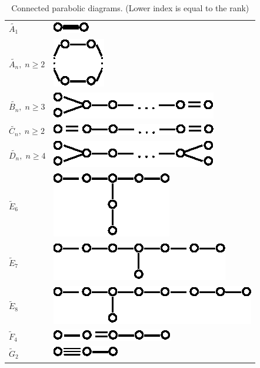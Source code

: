 \begin{center}
\renewcommand{\arraystretch}{1.1}
\tabcolsep=10pt
\begin{longtable}{@{}l@{\qquad\quad}l@{}}
\caption{Connected parabolic diagrams. (Lower index is equal to the rank)}\label{art10-table-2}\\
$\tilde{A_1}$ & {\includegraphics{345a1.eps}}\\
$\tilde{A_n}, \; n \geqslant 2$ & {\includegraphics{345a2.eps}}\\
$\tilde{B_n}, \; n \geqslant 3$ & {\includegraphics{345a3.eps}}\\
$\tilde{C_n}, \; n \geqslant 2$ & {\includegraphics{345a4.eps}}\\
$\tilde{D_n}, \; n \geqslant 4$ & {\includegraphics{345a5.eps}}\\
$\tilde{E}_6$ & {\includegraphics{345a6.eps}}\\
$\tilde{E}_7$ & {\includegraphics{345a7.eps}}\\
$\tilde{E}_8$ & {\includegraphics{345a8.eps}}\\
$\tilde{F}_4$ & {\includegraphics{345a9.eps}}\\
$\tilde{G}_2$ & {\includegraphics{345a10.eps}}\\
\end{longtable}
\end{center}


